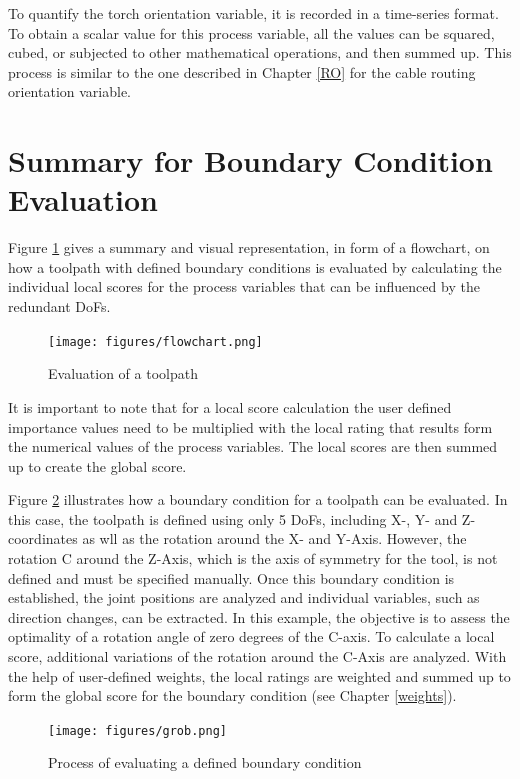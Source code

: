 To quantify the torch orientation variable, it is recorded in a time-series format. To obtain a scalar value for this process variable, all the values can be squared, cubed, or subjected to other mathematical operations, and then summed up. This process is similar to the one described in Chapter \ref{RO} for the cable routing orientation variable.


\newpage
\section{Summary for Boundary Condition Evaluation}
Figure \ref{allflow} gives a summary and visual representation, in form of a flowchart, on how a toolpath with defined boundary conditions is evaluated by calculating the individual local scores for the process variables that can be influenced by the redundant \acrshort{DoF}s.

\begin{figure}[H]
	\centerline{\texttt{[image: figures/flowchart.png]}}
	\caption{Evaluation of a toolpath}
	\label{allflow}
\end{figure}

\newpage
It is important to note that for a local score calculation the user defined importance values need to be multiplied with the local rating that results form the numerical values of the process variables. The local scores are then summed up to create the global score.

Figure \ref{grob} illustrates how a boundary condition for a toolpath can be evaluated. In this case, the toolpath is defined using only 5 \acrshort{DoF}s, including X-, Y- and Z-coordinates as wll as the rotation around the X- and Y-Axis. However, the rotation C around the Z-Axis, which is the axis of symmetry for the tool, is not defined and must be specified manually. Once this boundary condition is established, the joint positions are analyzed and individual variables, such as direction changes, can be extracted. In this example, the objective is to assess the optimality of a rotation angle of zero degrees of the C-axis. To calculate a local score, additional variations of the rotation around the C-Axis are analyzed. With the help of user-defined weights, the local ratings are weighted and summed up to form the global score for the boundary condition (see Chapter \ref{weights}).\newline


\begin{figure}[H]
	\centerline{\texttt{[image: figures/grob.png]}}
	\caption{Process of evaluating a defined boundary condition}
	\label{grob}
\end{figure}


